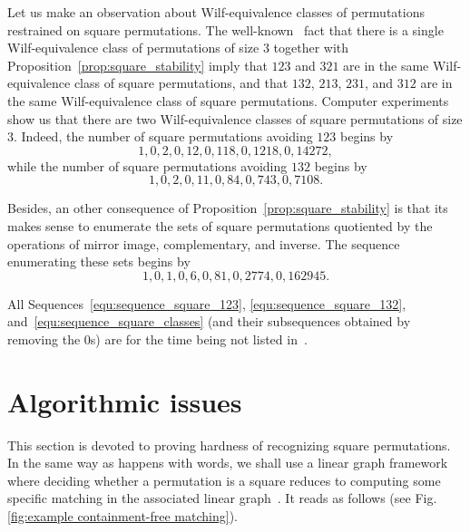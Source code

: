\documentclass[a4paper]{llncs}
\begin{document}
Let us make an observation about Wilf-equivalence classes of
permutations restrained on square permutations. The
well-known~\cite{Simion:Schmidt:EJC:1985} fact that there is a single
Wilf-equivalence class of permutations of size $3$ together with
Proposition~\ref{prop:square_stability} imply that $123$ and $321$ are
in the same Wilf-equivalence class of square permutations, and that
$132$, $213$, $231$, and $312$ are in the same Wilf-equivalence class of
square permutations. Computer experiments show us that there are two
Wilf-equivalence classes of square permutations of size $3$. Indeed, the
number of square permutations avoiding $123$ begins by
\begin{equation} \label{equ:sequence_square_123}
    1, 0, 2, 0, 12, 0, 118, 0, 1218, 0, 14272,
\end{equation}
while the number of square permutations avoiding $132$ begins by
\begin{equation} \label{equ:sequence_square_132}
    1, 0, 2, 0, 11, 0, 84, 0, 743, 0, 7108.
\end{equation}

Besides, an other consequence of Proposition~\ref{prop:square_stability}
is that its makes sense to enumerate the sets of square permutations
quotiented by the operations of mirror image, complementary, and
inverse. The sequence enumerating these sets begins by
\begin{equation} \label{equ:sequence_square_classes}
    1, 0, 1, 0, 6, 0, 81, 0, 2774, 0, 162945.
\end{equation}

All Sequences~\eqref{equ:sequence_square_123}, \eqref{equ:sequence_square_132},
and~\eqref{equ:sequence_square_classes} (and their subsequences obtained
by removing the $0$s) are for the time being not listed in~\cite{Slo}.


\section{Algorithmic issues}
\label{section:Algorithmic issues}

This section is devoted to proving hardness of recognizing square
permutations. In the same way as happens with words, we shall use a
linear graph framework where deciding whether a permutation is a square
reduces to computing some specific matching in the associated linear
graph~\cite{Buss:Soltys:2014,Rizzi:Vialette:CSR:2013}. It reads as follows
(see Fig.\ref{fig:example containment-free matching}).
\end{document}
